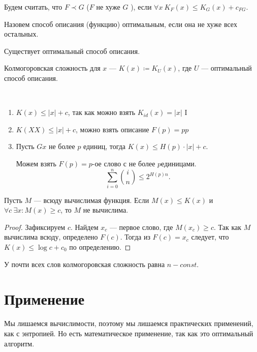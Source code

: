 Будем считать, что $ F \prec G$ ($ F$ не хуже  $ G$ ), если $ \forall x ~ K_F(x) \le K_G(x) + c_{FG}$.

Назовем способ описания (функцию) оптимальным, если она не хуже всех остальных.

\begin{thm}
    Существует оптимальный способ описания.
\end{thm}

\begin{defn}[]
	Колмогоровская сложность для $ x$ --- $ K(x) \coloneqq K_U(x)$, где $ U$ --- оптимальный способ описания.
\end{defn}
\begin{prop}
	~\begin{enumerate}
		\item
	$ K(x) \le \lvert x \rvert +c$, так как можно взять $ K_{id}(x) = \lvert x \rvert $
	I
\item $ K(XX) \le \lvert x \rvert +c$, можно взять описание $ F(p) = pp$ 
\item Пусть $G x$ не более $ p$ единиц, тогда $ K(x) \le H(p) \cdot \lvert x \rvert + c$.

	Можем взять $ F(p) = p\text{-ое слово с не более } p \text{единицами}$.
	\[
		\sum_{i=0}^{n} {i \choose n} \le 2 ^{H(p) n}
	.\] 
	\end{enumerate}
\end{prop}

\begin{thm}
	Пусть $ M$ --- всюду вычислимая функция. Если $ M(x) \le K(x)$ и $ \forall c ~ \exists x \colon M(x) \ge c$, то $ M$ не вычислима.
\end{thm}
\begin{proof}
	Зафиксируем $ c$. Найдем  $ x_c$ --- первое слово, где  $ M(x_c) \ge c$. Так как $ M$ вычислима всюду, определено $ F(c)$. 
	Тогда из $ F(c) = x_c$ следует, что  $ K(x) \le  \log c + c_0$ по определению.
\end{proof}

\begin{cor}
    У почти всех слов колмогоровская сложность равна $ n- const$.
\end{cor}

\section{Применение}
Мы лишаемся вычислимости, поэтому мы лишаемся практических применений, как с энтропией. Но есть математическое применение, так как это оптимальный алгоритм.

